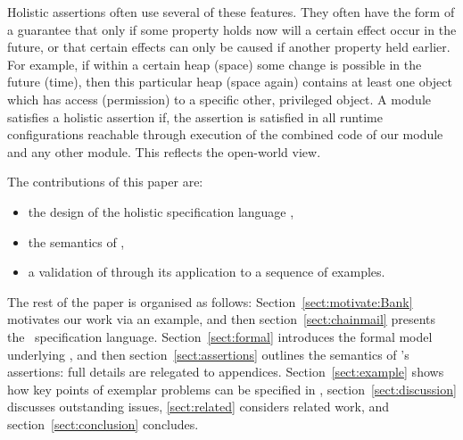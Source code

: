 Holistic assertions often use several of these features. They often have the form  of a guarantee
that only if some property holds now will a certain effect occur in the future, or that
certain effects can only be caused if another property held earlier.
For example, if within a certain heap (space) some change is possible in the future (time), then this particular heap 
(space again) contains 
at least one object which has access (permission) to a specific other, privileged object.
A module satisfies a holistic assertion if, 
  the assertion is satisfied  in all runtime configurations reachable through execution of the combined code of our module and any other module.
  This reflects the open-world view.


The contributions of this paper are:
\begin{itemize}
\item the design of the holistic specification language \Chainmail,
\item the semantics of \Chainmail,
\item a validation of \Chainmail through its application to a sequence of examples.
\end{itemize}  
  
  
The rest of the paper is organised as follows: Section~\ref{sect:motivate:Bank} 
motivates our work via an example, and then
section~\ref{sect:chainmail} presents the \Chainmail\ specification
language.  Section~\ref{sect:formal} introduces the formal model
underlying \Chainmail, and then section~\ref{sect:assertions} outlines
the 
semantics of \Chainmail's assertions: full details are relegated to
appendices.   Section~\ref{sect:example} shows how key points of 
exemplar problems can be specified in \Chainmail,
section~\ref{sect:discussion}
discusses outstanding issues, \ref{sect:related} considers related
work, and section~\ref{sect:conclusion} concludes.

